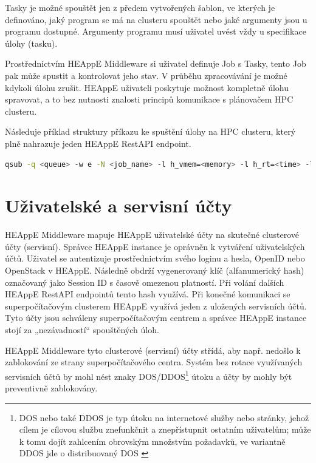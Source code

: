 Tasky je možné spouštět jen z předem vytvořených šablon, ve kterých je definováno, jaký program se má na clusteru spouštět nebo jaké argumenty jsou u programu dostupné. Argumenty programu musí uživatel uvést vždy u specifikace úlohy (tasku).

Prostřednictvím HEAppE Middleware si uživatel definuje Job s Tasky, tento Job pak může spustit a kontrolovat jeho stav. V průběhu zpracovávání je možné kdykoli úlohu zrušit. HEAppE uživateli poskytuje možnost kompletně úlohu spravovat, a to bez nutnosti znalosti principů komunikace s plánovačem HPC clusteru.

Následuje příklad struktury příkazu ke spuštění úlohy na HPC clusteru, který plně nahrazuje jeden HEAppE RestAPI endpoint.

\begin{lstlisting}[language=bash,caption={Struktura příkazu qsub \cite{iR8VZfeCCZ757gs1}}]
qsub -q <queue> -w e -N <job_name> -l h_vmem=<memory> -l h_rt=<time> -l s_rt=<time> -pe smp <num_slots> -o <outputlogfile> -e <errorlogfile> <pathtoScript> <arg1> <arg2>
\end{lstlisting}

\section{Uživatelské a servisní účty}
HEAppE Middleware mapuje HEAppE uživatelské účty na skutečné clusterové účty (servisní). Správce HEAppE instance je oprávněn k vytváření uživatelských účtů. Uživatel se autentizuje prostřednictvím svého loginu a hesla, OpenID nebo OpenStack v HEAppE. Následně obdrží vygenerovaný klíč (alfanumerický hash) označovaný jako Session ID s časově omezenou platností. Při volání dalších HEAppE RestAPI endpointů tento hash využívá. Při konečné komunikaci se superpočítačovým clusterem HEAppE využívá jeden z uložených servisních účtů. Tyto účty jsou schváleny superpočítačovým centrem a správce HEAppE instance stojí za „nezávadností“ spouštěných úloh. 

HEAppE Middleware tyto clusterové (servisní) účty střídá, aby např. nedošlo k zablokování ze strany superpočítačového centra. Systém bez rotace využívaných servisních účtů by mohl nést znaky DOS/DDOS\footnote{DOS nebo také DDOS je typ útoku na internetové služby nebo stránky, jehož cílem je cílovou službu znefunkčnit a znepřístupnit ostatním uživatelům; může k tomu dojít zahlcením obrovským množstvím požadavků, ve variantně DDOS jde o distribuovaný DOS \cite{UUBpn6UTaV8mOipc}} útoku a účty by mohly být preventivně zablokovány.

